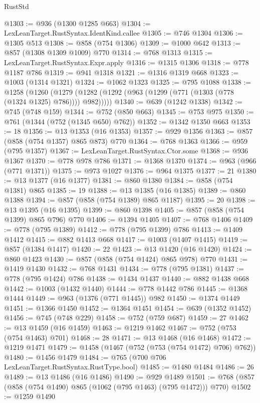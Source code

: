 \begin{lexlean}{RustStd}
\begin{coremodule}
@1303 := @936 (@1300 @1285 @663)
@1304 := LexLeanTarget.RustSyntax.IdentKind.callee
@1305 := @746 @1304
@1306 := @1305 @513
@1308 := @858 (@754 @1306)
@1309 := @1000 @642
@1313 := @857 (@1308 @1309 @1009) @770
@1314 := @768 @1313
@1315 := LexLeanTarget.RustSyntax.Expr.apply
@1316 := @1315 @1306
@1318 := @778 @1187 @786
@1319 := @941 @1318
@1321 := @1316 @1319 @668
@1323 := @1003 (@1314 @1321)
@1324 := @1062 @1323
@1325 := @795 @1088
@1338 := @1258
    (@1260 (@1279 (@1282 (@1292 (@963 (@1299 (@771 (@1303 (@778 (@1324 @1325) @786)))) @982)))))
@1340 := @639 (@1242 @1338)
@1342 := @745 (@748 @159)
@1344 := @752 (@850 @663)
@1345 := @753 @975
@1350 := @761 (@1344 (@752 (@1345 @650) @762))
@1352 := @1342 @1350 @663
@1353 := 18
@1356 := @13 @1353 (@16 @1353)
@1357 := @929 @1356
@1363 := @857 (@858 (@754 @1357) @865 @873) @770
@1364 := @768 @1363
@1366 := @959 (@795 @1357)
@1367 := LexLeanTarget.RustSyntax.Ctor.some
@1368 := @936 @1367
@1370 := @778 @978 @786
@1371 := @1368 @1370
@1374 := @963 (@966 (@771 @1371))
@1375 := @973 @1027
@1376 := @964 @1375
@1377 := 21
@1380 := @13 @1377 (@16 @1377)
@1381 := @860 @1380
@1384 := @858 (@754 @1381) @865
@1385 := 19
@1388 := @13 @1385 (@16 @1385)
@1389 := @860 @1388
@1394 := @857 (@858 (@754 @1389) @865 @1187)
@1395 := 20
@1398 := @13 @1395 (@16 @1395)
@1399 := @860 @1398
@1405 := @857 (@858 (@754 @1399) @865 @796) @770
@1406 := @1394 @1405
@1407 := @768 @1406
@1409 := @778 (@795 @1389)
@1412 := @778 (@795 @1399) @786
@1413 := @1409 @1412
@1415 := @882 @1413 @668
@1417 := @1003 (@1407 @1415)
@1419 := @857 (@1384 @1417)
@1420 := 22
@1423 := @13 @1420 (@16 @1420)
@1424 := @860 @1423
@1430 := @857 (@858 (@754 @1424) @865 @978) @770
@1431 := @1419 @1430
@1432 := @768 @1431
@1434 := @778 (@795 @1381)
@1437 := @778 (@795 @1424) @786
@1438 := @1434 @1437
@1440 := @882 @1438 @668
@1442 := @1003 (@1432 @1440)
@1444 := @778 @1442 @786
@1445 := @1368 @1444
@1449 := @963 (@1376 (@771 @1445)) @982
@1450 := @1374 @1449
@1451 := @1366 @1450
@1452 := @1364 @1451
@1454 := @639 (@1352 @1452)
@1456 := @745 (@748 @229)
@1458 := @752 (@759 @687)
@1459 := 27
@1462 := @13 @1459 (@16 @1459)
@1463 := @1219 @1462
@1467 := @752 (@753 (@754 @1463) @701)
@1468 := 28
@1471 := @13 @1468 (@16 @1468)
@1472 := @1219 @1471
@1479 := @1458 (@1467 (@752 (@753 (@754 @1472) @706) @762))
@1480 := @1456 @1479
@1484 := @765 (@700 @706 LexLeanTarget.RustSyntax.RustType.bool)
@1485 := @1480 @1484
@1486 := 26
@1489 := @13 @1486 (@16 @1486)
@1490 := @929 @1489
@1501 := @768 (@857 (@858 (@754 @1490) @865 (@1062 (@795 @1463) (@795 @1472))) @770)
@1502 := @1259 @1490

\end{coremodule}
\end{lexlean}
